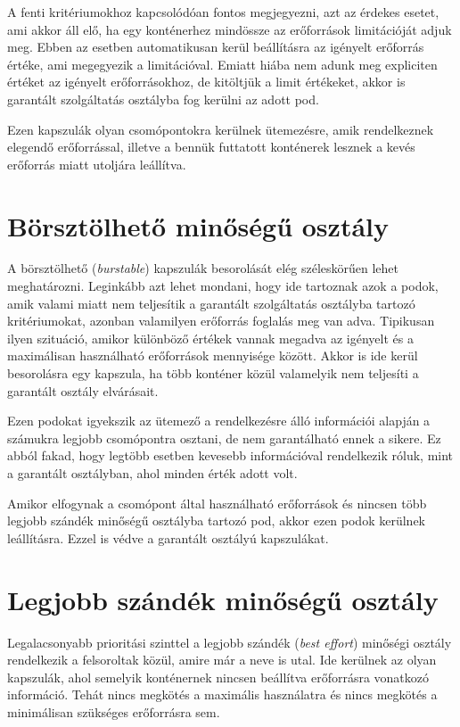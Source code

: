 A fenti kritériumokhoz kapcsolódóan fontos megjegyezni, azt az érdekes esetet, ami akkor áll elő, ha egy konténerhez mindössze az erőforrások limitációját adjuk meg.
Ebben az esetben automatikusan kerül beállításra az igényelt erőforrás értéke, ami megegyezik a limitációval.
Emiatt hiába nem adunk meg expliciten értéket az igényelt erőforrásokhoz, de kitöltjük a limit értékeket, akkor is garantált szolgáltatás osztályba fog kerülni az adott pod.

Ezen kapszulák olyan csomópontokra kerülnek ütemezésre, amik rendelkeznek elegendő erőforrással, illetve a bennük futtatott konténerek lesznek a kevés erőforrás miatt utoljára leállítva.

\section{Börsztölhető minőségű osztály}
A börsztölhető (\textit{burstable}) kapszulák besorolását elég széleskörűen lehet meghatározni.
Leginkább azt lehet mondani, hogy ide tartoznak azok a podok, amik valami miatt nem teljesítik a garantált szolgáltatás osztályba tartozó kritériumokat, azonban valamilyen erőforrás foglalás meg van adva.
Tipikusan ilyen szituáció, amikor különböző értékek vannak megadva az igényelt és a maximálisan használható erőforrások mennyisége között.
Akkor is ide kerül besorolásra egy kapszula, ha több konténer közül valamelyik nem teljesíti a garantált osztály elvárásait.

Ezen podokat igyekszik az ütemező a rendelkezésre álló információi alapján a számukra legjobb csomópontra osztani, de nem garantálható ennek a sikere.
Ez abból fakad, hogy legtöbb esetben kevesebb információval rendelkezik róluk, mint a garantált osztályban, ahol minden érték adott volt.

Amikor elfogynak a csomópont által használható erőforrások és nincsen több legjobb szándék minőségű osztályba tartozó pod, akkor ezen podok kerülnek leállításra. 
Ezzel is védve a garantált osztályú kapszulákat.

\section{Legjobb szándék minőségű osztály}
Legalacsonyabb prioritási szinttel a legjobb szándék (\textit{best effort}) minőségi osztály rendelkezik a felsoroltak közül, amire már a neve is utal.
Ide kerülnek az olyan kapszulák, ahol semelyik konténernek nincsen beállítva erőforrásra vonatkozó információ.
Tehát nincs megkötés a maximális használatra és nincs megkötés a minimálisan szükséges erőforrásra sem.

